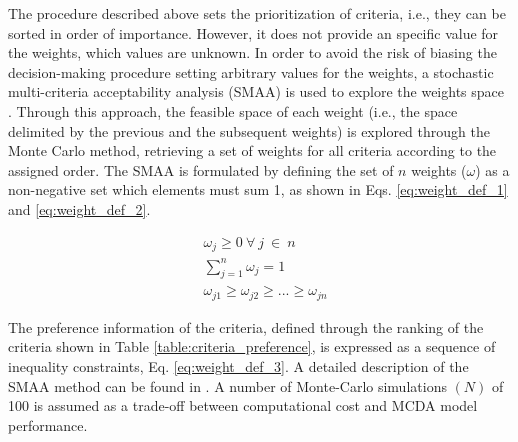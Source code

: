 \documentclass[authoryear]{elsarticle}
\begin{document}
The procedure described above sets the prioritization of criteria, i.e., they can be sorted in order of importance. However, it does not provide an specific value for the weights, which values are unknown. In order to avoid the risk of biasing the decision-making procedure setting arbitrary values for the weights, a stochastic multi-criteria acceptability analysis (SMAA) is used to explore the weights space \citep{tervonen_implementing_2007}. Through this approach, the feasible space of each weight (i.e., the space delimited by the previous and the subsequent weights) is explored through the Monte Carlo method, retrieving a set of weights for all criteria according to the assigned order. The SMAA is formulated by defining the set of $n$ weights ($\omega$) as a non-negative set which elements must sum 1, as shown in Eqs. \ref{eq:weight_def_1} and \ref{eq:weight_def_2}.

\begin{align}
	& \omega_{j} \geq 0 \ \forall \ j \ \in \ {n} \label{eq:weight_def_1}\\
	& \sum_{j=1}^{n} \omega_{j} = 1  \label{eq:weight_def_2} \\
%
	& \omega_{j1} \geq \omega_{j2} \geq ... \geq \omega_{jn} \label{eq:weight_def_3}
\end{align}

The preference information of the criteria, defined through the ranking of the criteria shown in Table \ref{table:criteria_preference}, is expressed as a sequence of inequality constraints, Eq. \ref{eq:weight_def_3}. A detailed description of the SMAA method can be found in \citet{tervonen_implementing_2007}. A number of Monte-Carlo simulations $\left(N\right)$ of 100 is assumed as a trade-off between computational cost and MCDA model performance.
\end{document}
